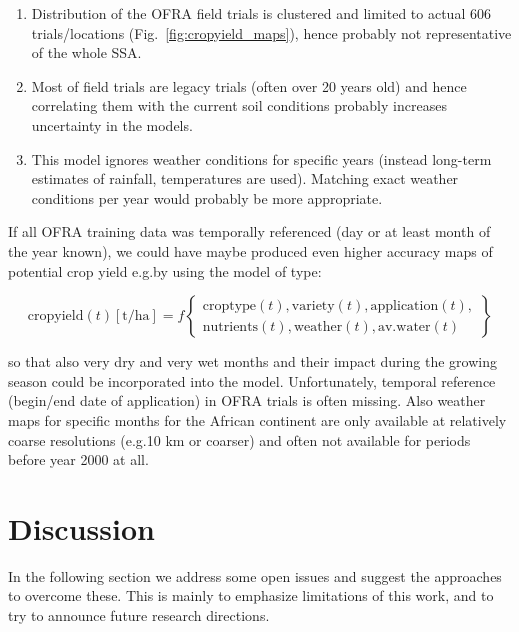 \begin{linenumbers}
\begin{enumerate}
\item Distribution of the OFRA field trials is clustered and limited to actual 606 trials/locations (Fig.\@~\ref{fig:cropyield_maps}), hence probably not representative of the whole SSA.
\item Most of field trials are legacy trials (often over 20 years old) and hence correlating them with the current soil conditions probably increases uncertainty in the models.
\item This model ignores weather conditions for specific years (instead long-term estimates of rainfall, temperatures are used). Matching exact weather conditions per year would probably be more appropriate. 
\end{enumerate}

If all OFRA training data was temporally referenced (day or at least month of the year known), we could have maybe produced even higher accuracy maps of potential crop yield e.g.\@ by using the model of type:

\begin{equation} \label{E:cropyield_st}
\mathrm{cropyield} (t) [\mathrm{t/ha}] = f \begin{Bmatrix} \mathrm{croptype} (t), \mathrm{variety} (t), \mathrm{application} (t), \\
\mathrm{nutrients} (t), \mathrm{weather} (t), \mathrm{av.water} (t) \end{Bmatrix}
\end{equation}

\noindent so that also very dry and very wet months and their impact during the growing season could be incorporated into the model. Unfortunately, temporal reference (begin/end date of application) in OFRA trials is often missing. Also weather maps for specific months for the African continent are only available at relatively coarse resolutions (e.g.\@ 10 km or coarser) and often not available for periods before year 2000 at all.\par

\section{Discussion}

In the following section we address some open issues and suggest the approaches to overcome these. This is mainly to emphasize limitations of this work, and to try to announce future research directions. \par


\end{linenumbers}

